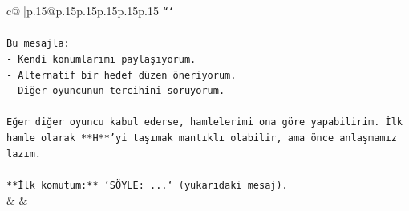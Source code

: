 \documentclass{article}
\begin{document}
{\begin{supertabular}{c@{$\;$}|p{.15\linewidth}@{}p{.15\linewidth}p{.15\linewidth}p{.15\linewidth}p{.15\linewidth}p{.15\linewidth}}
{{{\texttt{```} \\
\\ 
\texttt{Bu mesajla:} \\
\texttt{{-} Kendi konumlarımı paylaşıyorum.} \\
\texttt{{-} Alternatif bir hedef düzen öneriyorum.} \\
\texttt{{-} Diğer oyuncunun tercihini soruyorum.} \\
\\ 
\texttt{Eğer diğer oyuncu kabul ederse, hamlelerimi ona göre yapabilirim. İlk hamle olarak **H**'yi taşımak mantıklı olabilir, ama önce anlaşmamız lazım.} \\
\\ 
\texttt{**İlk komutum:** `SÖYLE: ...` (yukarıdaki mesaj).} \\
            }
        }
    }
    & & \\ \\


\end{supertabular}}
\end{document}
